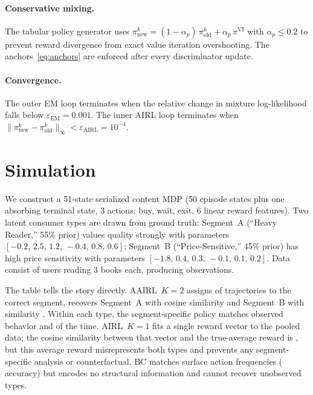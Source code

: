 \documentclass[11pt]{article}
\begin{document}
\paragraph{Conservative mixing.} The tabular policy generator uses $\pi^k_{\text{new}} = (1 - \alpha_p)\,\pi^k_{\text{old}} + \alpha_p\,\pi^{\text{VI}}$ with $\alpha_p \leq 0.2$ to prevent reward divergence from exact value iteration overshooting. The anchors~\eqref{eq:anchors} are enforced after every discriminator update.

\paragraph{Convergence.} The outer EM loop terminates when the relative change in mixture log-likelihood falls below $\varepsilon_{\text{EM}} = 0.001$. The inner AIRL loop terminates when $\|\pi^k_{\text{new}} - \pi^k_{\text{old}}\|_\infty < \varepsilon_{\text{AIRL}} = 10^{-4}$.

\section{Simulation}

We construct a 51-state serialized content MDP (50 episode states plus one absorbing terminal state, 3 actions: buy, wait, exit, 6 linear reward features). Two latent consumer types are drawn from ground truth: Segment~A (``Heavy Reader,'' 55\% prior) values quality strongly with parameters $[-0.2,\, 2.5,\, 1.2,\, -0.4,\, 0.8,\, 0.6]$; Segment~B (``Price-Sensitive,'' 45\% prior) has high price sensitivity with parameters $[-1.8,\, 0.4,\, 0.3,\, -0.1,\, 0.1,\, 0.2]$. Data consist of \aairlNusers{} users reading 3 books each, producing \aairlNobs{} observations.



The table tells the story directly. AAIRL~$K{=}2$ assigns \aairlSegAcc{} of trajectories to the correct segment, recovers Segment~A with cosine similarity \aairlCosA{} and Segment~B with similarity \aairlCosB{}. Within each type, the segment-specific policy matches observed behavior \aairlPaccA{} and \aairlPaccB{} of the time. AIRL~$K{=}1$ fits a single reward vector to the pooled data; the cosine similarity between that vector and the true-average reward is \airlKoneCos{}, but this average reward misrepresents both types and prevents any segment-specific analysis or counterfactual. BC matches surface action frequencies (\bcAcc{} accuracy) but encodes no structural information and cannot recover unobserved types.
\end{document}
